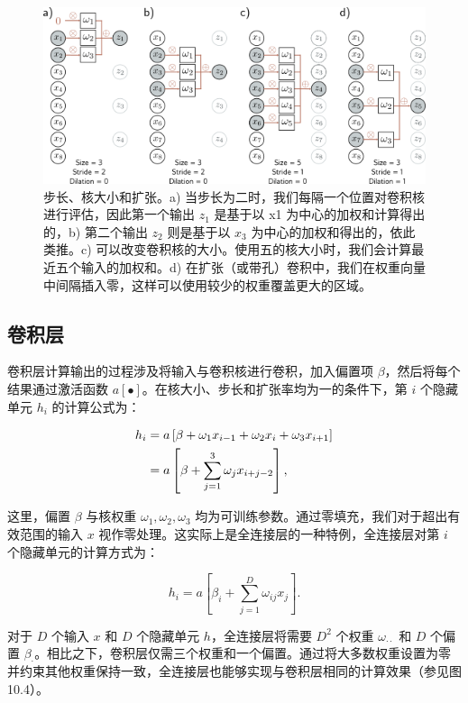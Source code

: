 \begin{figure}[ht!]
\centering
\includegraphics[width=0.7\linewidth]{png/chapter10/Conv1a.png}
\caption{步长、核大小和扩张。a) 当步长为二时，我们每隔一个位置对卷积核进行评估，因此第一个输出 \(z_1\) 是基于以 x1 为中心的加权和计算得出的，b) 第二个输出 \(z_2\) 则是基于以 \(x_3\) 为中心的加权和得出的，依此类推。c) 可以改变卷积核的大小。使用五的核大小时，我们会计算最近五个输入的加权和。d) 在扩张（或带孔）卷积中，我们在权重向量中间隔插入零，这样可以使用较少的权重覆盖更大的区域。}
\end{figure}



\subsection{卷积层}
卷积层计算输出的过程涉及将输入与卷积核进行卷积，加入偏置项 \(\beta\)，然后将每个结果通过激活函数 \(a[•]\)。在核大小、步长和扩张率均为一的条件下，第 \(i\) 个隐藏单元 \(h_i\) 的计算公式为：


\begin{align}
h_i &= a \left[ \beta + \omega_1 x_{i-1} + \omega_2 x_i + \omega_3 x_{i+1} \right] \notag \\
&= a \left[ \beta + \sum_{j=1}^{3} \omega_j x_{i+j-2} \right], 
\end{align} 

这里，偏置 \(\beta\) 与核权重 \(\omega_1, \omega_2, \omega_3\) 均为可训练参数。通过零填充，我们对于超出有效范围的输入 \(x\) 视作零处理。这实际上是全连接层的一种特例，全连接层对第 \(i\) 个隐藏单元的计算方式为：

\begin{equation}
h_i = a \left[ \beta_i + \sum_{j=1}^{D} \omega_{ij} x_j \right]. 
\end{equation}

对于 \(D\) 个输入 \(x\) 和 \(D\) 个隐藏单元 \(h\)，全连接层将需要 \(D^2\) 个权重 \(\omega_{\cdot \cdot}\) 和 \(D\) 个偏置 \(\beta_{\cdot}\)。相比之下，卷积层仅需三个权重和一个偏置。通过将大多数权重设置为零并约束其他权重保持一致，全连接层也能够实现与卷积层相同的计算效果（参见图 10.4）。


